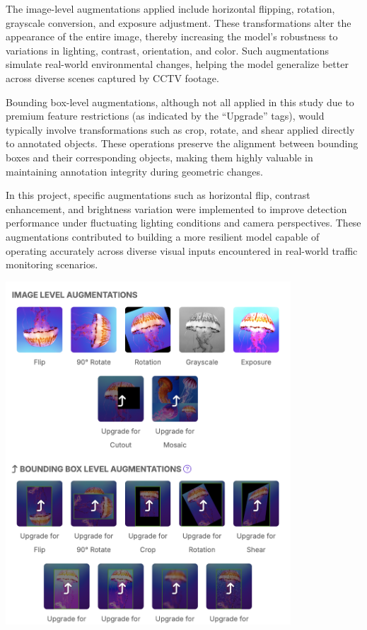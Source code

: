 \begin{itemize}
	
	\noindent\hspace{2.5em}The image-level augmentations applied include horizontal flipping, rotation, grayscale conversion, and exposure adjustment. These transformations alter the appearance of the entire image, thereby increasing the model’s robustness to variations in lighting, contrast, orientation, and color. Such augmentations simulate real-world environmental changes, helping the model generalize better across diverse scenes captured by CCTV footage.
	
	
	\noindent\hspace{2.5em}Bounding box-level augmentations, although not all applied in this study due to premium feature restrictions (as indicated by the “Upgrade” tags), would typically involve transformations such as crop, rotate, and shear applied directly to annotated objects. These operations preserve the alignment between bounding boxes and their corresponding objects, making them highly valuable in maintaining annotation integrity during geometric changes.
	
	
	\noindent\hspace{2.5em}In this project, specific augmentations such as horizontal flip, contrast enhancement, and brightness variation were implemented to improve detection performance under fluctuating lighting conditions and camera perspectives. These augmentations contributed to building a more resilient model capable of operating accurately across diverse visual inputs encountered in real-world traffic monitoring scenarios.
	\begin{center}
		\includegraphics[width=0.8\textwidth]{Augmentation.png}
		

\end{center}
\end{itemize}

